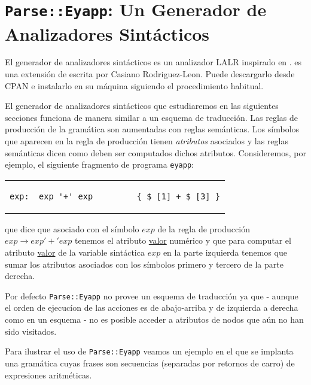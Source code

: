 \section{{\tt Parse::Eyapp}: Un Generador de Analizadores Sintácticos}
\label{section:ungeneradordeanalizadoressintacticos}
El generador de analizadores sintácticos  es un
analizador LALR inspirado en . 
es una extensión de 
escrita por Casiano
Rodriguez-Leon. Puede descargarlo desde CPAN e instalarlo en su máquina siguiendo
el procedimiento habitual.

El generador de analizadores sintácticos  que
estudiaremos en las siguientes secciones funciona de manera similar
a un esquema de traducción. Las reglas de producción de la gramática
son aumentadas con reglas semánticas. Los símbolos que aparecen en la regla
de producción tienen \emph{atributos} asociados y las reglas semánticas
dicen como deben ser computados dichos atributos.
Consideremos, por ejemplo, el siguiente fragmento de programa \verb|eyapp|:

\begin{center}
\begin{tabular}{p{12cm}}
\begin{verbatim}
exp:  exp '+' exp         { $_[1] + $_[3] }
\end{verbatim}\\
\end{tabular}
\end{center}

que dice que asociado con el símbolo $exp$ de la regla de producción  $exp \rightarrow exp '+' exp$ 
tenemos el atributo  \underline{valor} numérico y que para computar el atributo 
\underline{valor} de la variable sintáctica $exp$ en la parte izquierda tenemos
que sumar los atributos asociados con los símbolos primero y tercero de la parte derecha.

Por defecto \verb|Parse::Eyapp| no provee un esquema de traducción ya que - aunque el orden de
ejecucíon de las acciones es de abajo-arriba y de izquierda a derecha como en un esquema -
no es posible acceder a atributos de nodos que aún no han sido visitados.

Para ilustrar el uso de \verb|Parse::Eyapp| veamos
un ejemplo en el que se implanta una gramática
cuyas frases son secuencias (separadas por retornos de carro)
de expresiones aritméticas.

